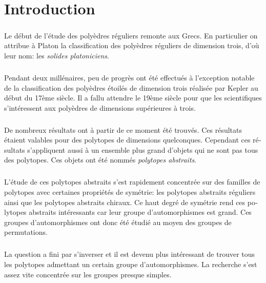 \chapter*{Introduction}

\begin{otherlanguage}{french}

\paragraph{}
Le début de l'étude des polyèdres réguliers remonte aux Grecs. En particulier on attribue à Platon la classification des   polyèdres réguliers de dimension trois, d'où leur nom: les \textit{solides platoniciens}.

\paragraph{}
Pendant deux millénaires, peu de progrès ont été effectués à l'exception notable de la classification des polyèdres étoilés de dimension trois réalisée par Kepler au début du 17ème siècle. Il a fallu attendre le 19ème siècle pour que les scientifiques s'intéressent aux polyèdres de dimensions supérieures à trois.

\paragraph{}
De nombreux résultats ont à partir de ce moment été trouvés. Ces résultats étaient valables pour des polytopes de dimensions quelconques. Cependant ces résultats s'appliquent aussi à un ensemble plus grand d'objets qui ne sont pas tous des polytopes. Ces objets ont été nommés \textit{polytopes abstraits}.

\paragraph{}
L'étude de ces polytopes abstraits s'est rapidement concentrée sur des familles de polytopes avec certaines propriétés de symétrie: les polytopes abstraits réguliers ainsi que les polytopes abstraits chiraux. Ce haut degré de symétrie rend ces polytopes abstraits intéressants car leur groupe d'automorphismes est grand. Ces groupes d'automorphismes ont donc été étudié au moyen des groupes de permutations.

\paragraph{}
La question a fini par s'inverser et il est devenu plus intéressant de trouver tous les polytopes admettant un certain groupe d'automorphismes. La recherche s'est assez vite concentrée sur les groupes presque simples.


\end{otherlanguage}
